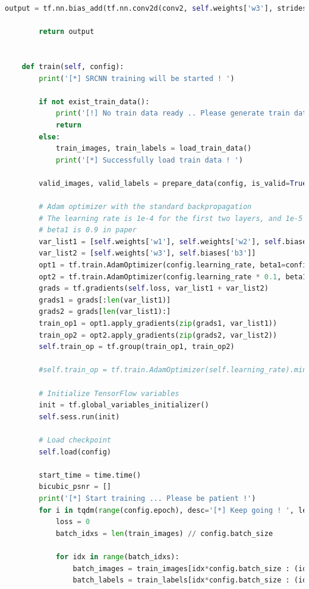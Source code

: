 \documentclass[11pt,UTF8]{ctexart}
\begin{document}
\begin{lstlisting}[language={python}]
        output = tf.nn.bias_add(tf.nn.conv2d(conv2, self.weights['w3'], strides=[1,1,1,1], padding='VALID'), self.biases['b3'])
    
        return output


    def train(self, config):
        print('[*] SRCNN training will be started ! ')

        if not exist_train_data():
            print('[!] No train data ready .. Please generate train data first with Matlab')
            return
        else:
            train_images, train_labels = load_train_data()
            print('[*] Successfully load train data ! ')
       
        valid_images, valid_labels = prepare_data(config, is_valid=True)

        # Adam optimizer with the standard backpropagation
        # The learning rate is 1e-4 for the first two layers, and 1e-5 for the last layer
        # beta1 is 0.9 in paper
        var_list1 = [self.weights['w1'], self.weights['w2'], self.biases['b1'], self.biases['b2']]
        var_list2 = [self.weights['w3'], self.biases['b3']]
        opt1 = tf.train.AdamOptimizer(config.learning_rate, beta1=config.beta1)
        opt2 = tf.train.AdamOptimizer(config.learning_rate * 0.1, beta1=config.beta1)
        grads = tf.gradients(self.loss, var_list1 + var_list2)
        grads1 = grads[:len(var_list1)]
        grads2 = grads[len(var_list1):]
        train_op1 = opt1.apply_gradients(zip(grads1, var_list1))
        train_op2 = opt2.apply_gradients(zip(grads2, var_list2))
        self.train_op = tf.group(train_op1, train_op2)

        #self.train_op = tf.train.AdamOptimizer(self.learning_rate).minimize(self.loss)

        # Initialize TensorFlow variables
        init = tf.global_variables_initializer()
        self.sess.run(init)

        # Load checkpoint
        self.load(config)

        start_time = time.time()
        bicubic_psnr = []
        print('[*] Start training ... Please be patient !')
        for i in tqdm(range(config.epoch), desc='[*] Keep going ! ', leave=True):
            loss = 0
            batch_idxs = len(train_images) // config.batch_size
            
            for idx in range(batch_idxs):
                batch_images = train_images[idx*config.batch_size : (idx+1)*config.batch_size]
                batch_labels = train_labels[idx*config.batch_size : (idx+1)*config.batch_size]
            

\end{lstlisting}
\end{document}
